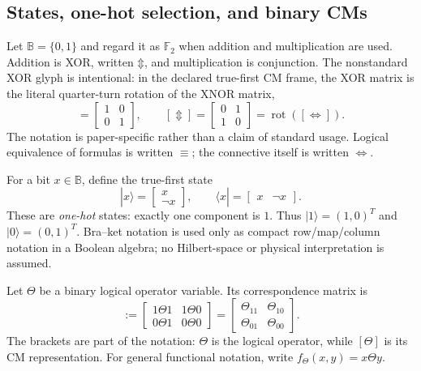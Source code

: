 \documentclass[11pt]{article}
\theoremstyle{definition}
\theoremstyle{remark}
\newcommand{\B}{\mathbb B}
\newcommand{\F}{\mathbb F}
\newcommand{\rot}{\operatorname{rot}}
\newcommand{\xor}{\mathbin{\Updownarrow}}
\begin{document}
\subsection{States, one-hot selection, and binary CMs}

Let $\B=\{0,1\}$ and regard it as $\F_2$ when addition and multiplication are used.  Addition is XOR, written $\xor$, and multiplication is conjunction.  The nonstandard XOR glyph is intentional: in the declared true-first CM frame, the XOR matrix is the literal quarter-turn rotation of the XNOR matrix,
\begin{equation}
 [\Leftrightarrow]=\begin{bmatrix}1&0\\0&1\end{bmatrix},\qquad
 [\Updownarrow]=\begin{bmatrix}0&1\\1&0\end{bmatrix}
 =\rot\!\left([\Leftrightarrow]\right).
 \label{eq:xorrotationmotivation}
\end{equation}
The notation is paper-specific rather than a claim of standard usage.  Logical equivalence of formulas is written $\equiv$; the connective itself is written $\Leftrightarrow$.

For a bit $x\in\B$, define the true-first state
\begin{equation}
 |x\rangle=\begin{bmatrix}x\\ \neg x\end{bmatrix},
 \qquad
 \langle x|=\begin{bmatrix}x&\neg x\end{bmatrix}.
 \label{eq:state}
\end{equation}
These are \emph{one-hot} states: exactly one component is $1$.  Thus $|1\rangle=(1,0)^T$ and $|0\rangle=(0,1)^T$.  Bra--ket notation is used only as compact row/map/column notation in a Boolean algebra; no Hilbert-space or physical interpretation is assumed.

Let $\Theta$ be a binary logical operator variable.  Its correspondence matrix is
\begin{equation}
 [\Theta]:=
 \begin{bmatrix}
 1\Theta1&1\Theta0\\
 0\Theta1&0\Theta0
 \end{bmatrix}
 =\begin{bmatrix}\Theta_{11}&\Theta_{10}\\\Theta_{01}&\Theta_{00}\end{bmatrix}.
 \label{eq:binarycm}
\end{equation}
The brackets are part of the notation: $\Theta$ is the logical operator, while $[\Theta]$ is its CM representation.  For general functional notation, write $f_\Theta(x,y)=x\Theta y$.
\end{document}
